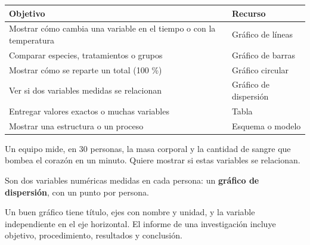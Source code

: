 \begin{center}\small
\begin{tabularx}{\linewidth}{@{}>{\raggedright\arraybackslash\hsize=1.31\hsize}X>{\raggedright\arraybackslash\hsize=0.69\hsize}X@{}}
\toprule
\textbf{Objetivo} & \textbf{Recurso} \\
\midrule
Mostrar cómo cambia una variable en el tiempo o con la temperatura & Gráfico de líneas \\
Comparar especies, tratamientos o grupos & Gráfico de barras \\
Mostrar cómo se reparte un total (100 \%) & Gráfico circular \\
Ver si dos variables medidas se relacionan & Gráfico de dispersión \\
Entregar valores exactos o muchas variables & Tabla \\
Mostrar una estructura o un proceso & Esquema o modelo \\
\bottomrule
\end{tabularx}
\end{center}
  
\begin{ejemplo} Un equipo mide, en 30 personas, la masa corporal y la cantidad de sangre que bombea el corazón en un minuto. Quiere mostrar si estas variables se relacionan.\par Son dos variables numéricas medidas en cada persona: un \textbf{gráfico de dispersión}, con un punto por persona.\end{ejemplo}
 
\begin{clave}[{Recuerda}] Un buen gráfico tiene título, ejes con nombre y unidad, y la variable independiente en el eje horizontal. El informe de una investigación incluye objetivo, procedimiento, resultados y conclusión.\end{clave}
